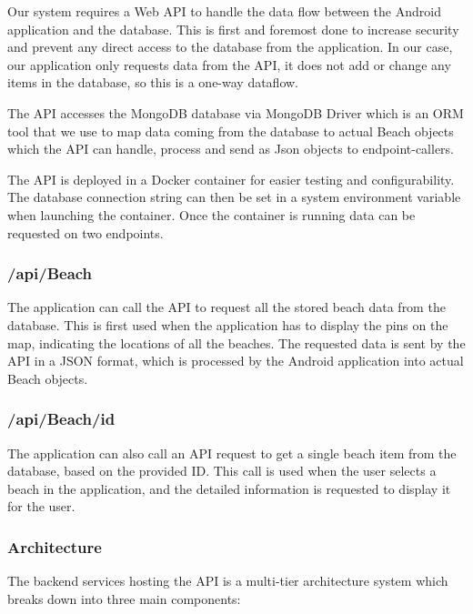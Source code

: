 Our system requires a Web API to handle the data flow between the Android application and the database. This is first and foremost done to increase security and prevent any direct access to the database from the application. In our case, our application only requests data from the API, it does not add or change any items in the database, so this is a one-way dataflow.

The API accesses the MongoDB database via MongoDB Driver which is an ORM tool that we use to map data coming from the database to actual Beach objects which the API can handle, process and send as Json objects to endpoint-callers. 

The API is deployed in a Docker container for easier testing and configurability. The database connection string can then be set in a system environment variable when launching the container. Once the container is running data can be requested on two endpoints.

\subsubsection{/api/Beach}

The application can call the API to request all the stored beach data from the database. This is first used when the application has to display the pins on the map, indicating the locations of all the beaches. The requested data is sent by the API in a JSON format, which is processed by the Android application into actual Beach objects.

\subsubsection{/api/Beach/{id}}

The application can also call an API request to get a single beach item from the database, based on the provided ID. This call is used when the user selects a beach in the application, and the detailed information is requested to display it for the user. 

\subsubsection{Architecture}

The backend services hosting the API is a multi-tier architecture system which breaks down into three main components:

